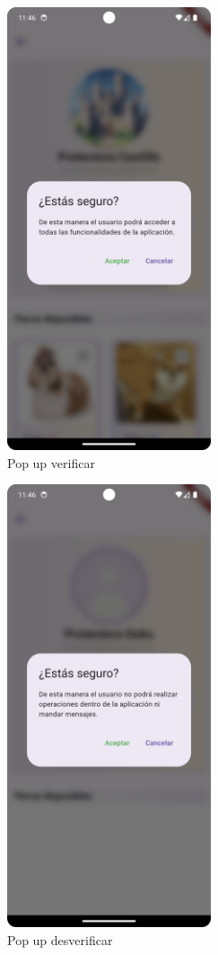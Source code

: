 \documentclass[a4paper, 12pt]{article}
\begin{document}
\begin{figure}[H]
	\begin{center}
		{\includegraphics[width=6cm]{app/AdminVerifyPopUp}\par}
		\caption{Pop up verificar}
	\end{center}
\end{figure}

\begin{figure}[H]
	\begin{center}
		{\includegraphics[width=6cm]{app/AdminUnVerifyPopUp}\par}
		\caption{Pop up desverificar}
	\end{center}
\end{figure}
\end{document}
